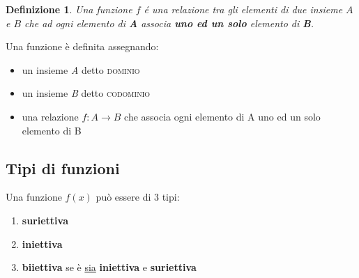 \documentclass[12pt, a4paper]{article}
\theoremstyle{break}
\newtheorem{defn}{Definizione}
\theoremstyle{lemma}
\theoremstyle{lemma}
\theoremstyle{lemma}
\begin{document}
\begin{defn}
Una funzione $f$ é una relazione tra gli elementi di due insieme $A$ e $B$ che ad ogni elemento di \textbf{A} associa \textbf{uno ed un solo} elemento di \textbf{B}.
\end{defn}


Una funzione è definita assegnando:
\begin{itemize}
\item un insieme \textit{A} detto  \textsc{dominio}
\item un insieme \textit{B} detto \textsc{codominio}
\item una relazione $f: A \rightarrow B$ che associa ogni elemento di A uno ed un solo elemento di B
\end{itemize}


\subsection{Tipi di funzioni}

Una funzione $f(x)$ può essere di 3 tipi:
\begin{enumerate}
    \item \textbf{suriettiva}
    \item \textbf{iniettiva}
    \item \textbf{biiettiva} se è \underline{sia} \textbf{iniettiva} e  \textbf{suriettiva}
    \end{enumerate}
\end{document}
